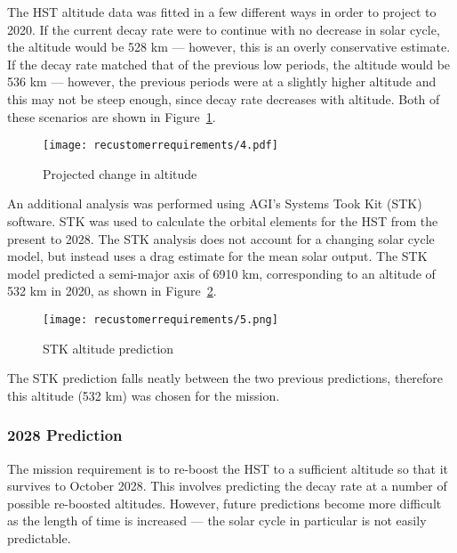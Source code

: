 \documentclass[onecolumn,10pt]{jhwhw}
\begin{document}
The HST altitude data was fitted in a few different ways in order to project to 2020. If the current decay rate were to continue with no decrease in solar cycle, the altitude would be 528 km --- however, this is an overly conservative estimate. If the decay rate matched that of the previous low periods, the altitude would be 536 km --- however, the previous periods were at a slightly higher altitude and this may not be steep enough, since decay rate decreases with altitude. Both of these scenarios are shown in Figure~\ref{fig:fig4}.

\begin{figure}[tb!]
\begin{center}
\texttt{[image: recustomerrequirements/4.pdf]}
\caption{Projected change in altitude}
\label{fig:fig4}
\end{center}
\end{figure}

An additional analysis was performed using AGI's Systems Took Kit (STK) software. STK was used to calculate the orbital elements for the HST from the present to 2028. The STK analysis does not account for a changing solar cycle model, but instead uses a drag estimate for the mean solar output. The STK model predicted a semi-major axis of 6910 km, corresponding to an altitude of 532 km in 2020, as shown in Figure~\ref{fig:fig5}.

\begin{figure}[tb!]
\begin{center}
\texttt{[image: recustomerrequirements/5.png]}
\caption{STK altitude prediction}
\label{fig:fig5}
\end{center}
\end{figure}

The STK prediction falls neatly between the two previous predictions, therefore this altitude (532 km) was chosen for the mission.

\subsubsection{2028 Prediction}

The mission requirement is to re-boost the HST to a sufficient altitude so that it survives to October 2028. This involves predicting the decay rate at a number of possible re-boosted altitudes. However, future predictions become more difficult as the length of time is increased --- the solar cycle in particular is not easily predictable.
\end{document}
